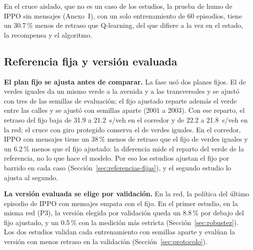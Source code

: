En el cruce aislado, que no es un caso de los estudios, la prueba de
humo de IPPO sin mensajes (Anexo~I), con un solo entrenamiento de 60
episodios, tiene un 30.7\,\% menos de retraso que Q-learning, del que
difiere a la vez en el estado, la recompensa y el algoritmo.

\subsection*{Referencia fija y versión evaluada}

\noindent\textbf{El plan fijo se ajusta antes de comparar.} La fase usó
dos planes fijos. El de verdes iguales da un mismo verde a la avenida y
a las transversales y se ajustó con tres de las semillas de evaluación;
el fijo ajustado reparte además el verde entre las calles y se ajustó
con semillas aparte (2001 a 2003). Con ese reparto, el retraso del fijo
baja de 31.9 a 21.2~s/veh en el corredor y de 22.2 a 21.8~s/veh en la
red; el cruce con giro protegido conserva el de verdes iguales. En el
corredor, IPPO con mensajes tiene un 38\,\% menos de retraso que el fijo
de verdes iguales y un 6.2\,\% menos que el fijo ajustado: la diferencia
mide el reparto del verde de la referencia, no lo que hace el modelo.
Por eso los estudios ajustan el fijo por barrido en cada caso
(Sección~\ref{sec:referencias-fijas}), y el segundo estudio lo ajusta
al segundo.

\noindent\textbf{La versión evaluada se elige por validación.} En la
red, la política del último episodio de IPPO con mensajes empata con el
fijo. En el primer estudio, en la misma red (P3), la versión elegida por
validación queda un 8.8\,\% por debajo del fijo ajustado, y un 0.5\,\%
con la medición más estricta (Sección~\ref{sec:robustez}). Los dos
estudios validan cada entrenamiento con semillas aparte y evalúan la
versión con menos retraso en la validación
(Sección~\ref{sec:protocolo}).

